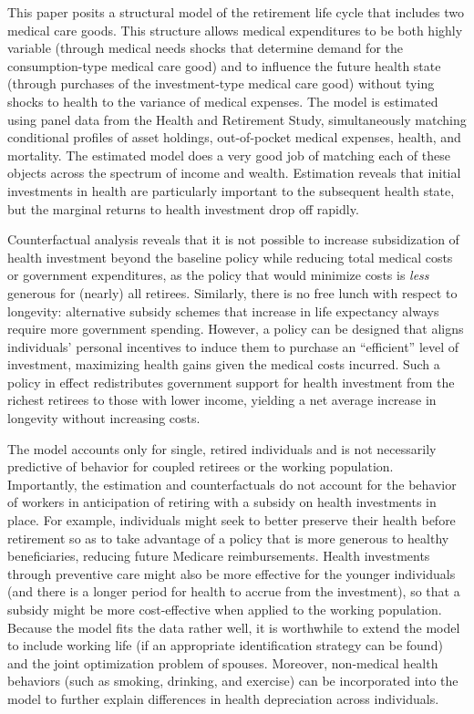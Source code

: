 \documentclass[12pt,pdftex,letterpaper]{article}
\begin{document}
This paper posits a structural model of the retirement life cycle that includes two medical care goods.  This structure allows medical expenditures to be both highly variable (through medical needs shocks that determine demand for the consumption-type medical care good) and to influence the future health state (through purchases of the investment-type medical care good) without tying shocks to health to the variance of medical expenses.  The model is estimated using panel data from the Health and Retirement Study, simultaneously matching conditional profiles of asset holdings, out-of-pocket medical expenses, health, and mortality.  The estimated model does a very good job of matching each of these objects across the spectrum of income and wealth.  Estimation reveals that initial investments in health are particularly important to the subsequent health state, but the marginal returns to health investment drop off rapidly.

Counterfactual analysis reveals that it is not possible to increase subsidization of health investment beyond the baseline policy while reducing total medical costs or government expenditures, as the policy that would minimize costs is \textit{less} generous for (nearly) all retirees.  Similarly, there is no free lunch with respect to longevity: alternative subsidy schemes that increase in life expectancy always require more government spending.  However, a policy can be designed that aligns individuals' personal incentives to induce them to purchase an ``efficient'' level of investment, maximizing health gains given the medical costs incurred.  Such a policy in effect redistributes government support for health investment from the richest retirees to those with lower income, yielding a net average increase in longevity without increasing costs.

The model accounts only for single, retired individuals and is not necessarily predictive of behavior for coupled retirees or the working population.  Importantly, the estimation and counterfactuals do not account for the behavior of workers in anticipation of retiring with a subsidy on health investments in place.  For example, individuals might seek to better preserve their health before retirement so as to take advantage of a policy that is more generous to healthy beneficiaries, reducing future Medicare reimbursements.  Health investments through preventive care might also be more effective for the younger individuals (and there is a longer period for health to accrue from the investment), so that a subsidy might be more cost-effective when applied to the working population.  Because the model fits the data rather well, it is worthwhile to extend the model to include working life (if an appropriate identification strategy can be found) and the joint optimization problem of spouses.  Moreover, non-medical health behaviors (such as smoking, drinking, and exercise) can be incorporated into the model to further explain differences in health depreciation across individuals.
\end{document}
